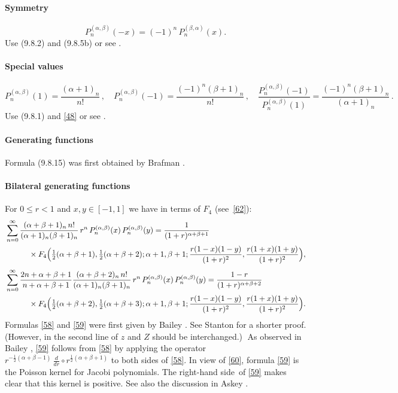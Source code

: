 \documentclass[envcountchap,graybox]{svmono}
\newcounter{rom}
\newcommand\sa{\smallskipamount}
\newcommand\sLP{\\[\sa]}
\newcommand\al\alpha
\newcommand\be\beta
\newcommand\half{\frac12}
\newcommand\thalf{\tfrac12}
\newcommand\iy\infty
\newcommand\RHS{right-hand side}
\begin{document}
%
\paragraph{Symmetry}
\begin{equation}
P_n^{(\al,\be)}(-x)=(-1)^n\,P_n^{(\be,\al)}(x).
\label{48}
\end{equation}
Use (9.8.2) and (9.8.5b) or see .
%
\paragraph{Special values}
\begin{equation}
P_n^{(\al,\be)}(1)=\frac{(\al+1)_n}{n!}\,,\quad
P_n^{(\al,\be)}(-1)=\frac{(-1)^n(\be+1)_n}{n!}\,,\quad
\frac{P_n^{(\al,\be)}(-1)}{P_n^{(\al,\be)}(1)}=\frac{(-1)^n(\be+1)_n}{(\al+1)_n}\,.
\label{50}
\end{equation}
Use (9.8.1) and \eqref{48} or see .
%
\paragraph{Generating functions}
Formula (9.8.15) was first obtained by Brafman .
%
\paragraph{Bilateral generating functions}
For $0\le r<1$ and $x,y\in[-1,1]$ we have in terms of $F_4$ (see~\eqref{62}):
\begin{align}
&\sum_{n=0}^\iy\frac{(\al+\be+1)_n\,n!}{(\al+1)_n(\be+1)_n}\,r^n\,
P_n^{(\al,\be)}(x)\,P_n^{(\al,\be)}(y)
=\frac1{(1+r)^{\al+\be+1}}
\nonumber\\
&\qquad\quad\times F_4\Big(\thalf(\al+\be+1),\thalf(\al+\be+2);\al+1,\be+1;
\frac{r(1-x)(1-y)}{(1+r)^2},\frac{r(1+x)(1+y)}{(1+r)^2}\Big),
\label{58}\sLP
&\sum_{n=0}^\iy\frac{2n+\al+\be+1}{n+\al+\be+1}
\frac{(\al+\be+2)_n\,n!}{(\al+1)_n(\be+1)_n}\,r^n\,
P_n^{(\al,\be)}(x)\,P_n^{(\al,\be)}(y)
=\frac{1-r}{(1+r)^{\al+\be+2}}\nonumber\\
&\qquad\quad\times F_4\Big(\thalf(\al+\be+2),\thalf(\al+\be+3);\al+1,\be+1;
\frac{r(1-x)(1-y)}{(1+r)^2},\frac{r(1+x)(1+y)}{(1+r)^2}\Big).
\label{59}
\end{align}
Formulas \eqref{58} and \eqref{59} were first
given by Bailey .
See Stanton  for a shorter proof.
(However, in the second line of
 $z$ and $Z$ should be interchanged.)$\;$
As observed in Bailey , \eqref{59} follows
from \eqref{58}
by applying the operator $r^{-\half(\al+\be-1)}\,\frac d{dr}\circ r^{\half(\al+\be+1)}$
to both sides of \eqref{58}.
In view of \eqref{60}, formula \eqref{59} is the Poisson kernel for Jacobi
polynomials. The \RHS\ of \eqref{59} makes clear that this kernel is positive.
See also the discussion in Askey .
%
\end{document}
